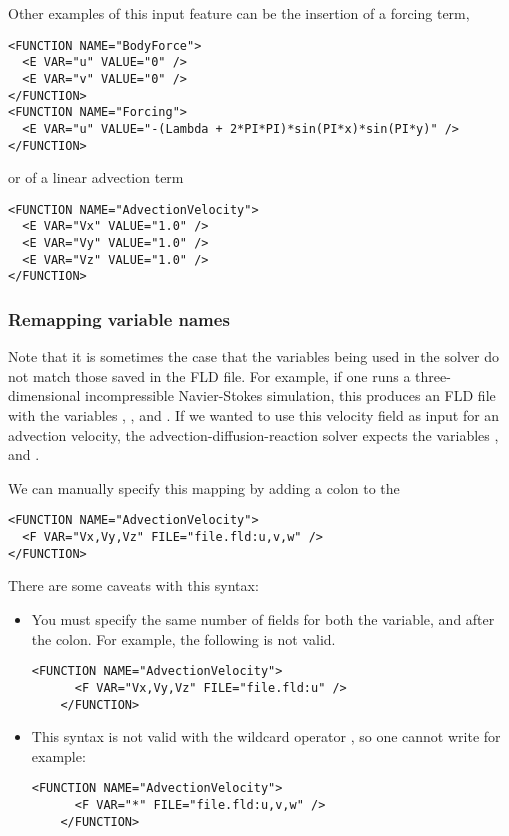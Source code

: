 Other examples of this input feature can be the insertion of a forcing term,

\begin{lstlisting}[style=XMLStyle]
<FUNCTION NAME="BodyForce">
  <E VAR="u" VALUE="0" />
  <E VAR="v" VALUE="0" />
</FUNCTION>
<FUNCTION NAME="Forcing">
  <E VAR="u" VALUE="-(Lambda + 2*PI*PI)*sin(PI*x)*sin(PI*y)" />
</FUNCTION>
\end{lstlisting}

or of a linear advection term

\begin{lstlisting}[style=XMLStyle]
<FUNCTION NAME="AdvectionVelocity">
  <E VAR="Vx" VALUE="1.0" />
  <E VAR="Vy" VALUE="1.0" />
  <E VAR="Vz" VALUE="1.0" />
</FUNCTION>
\end{lstlisting}

\subsubsection{Remapping variable names}

Note that it is sometimes the case that the variables being used in the solver
do not match those saved in the FLD file. For example, if one runs a
three-dimensional incompressible Navier-Stokes simulation, this produces an FLD
file with the variables , ,  and . If we
wanted to use this velocity field as input for an advection velocity, the
advection-diffusion-reaction solver expects the variables , 
and .

We can manually specify this mapping by adding a colon to the

\begin{lstlisting}[style=XMLStyle]
<FUNCTION NAME="AdvectionVelocity">
  <F VAR="Vx,Vy,Vz" FILE="file.fld:u,v,w" />
</FUNCTION>
\end{lstlisting}

There are some caveats with this syntax:

\begin{itemize}
  \item You must specify the same number of fields for both the variable, and
  after the colon. For example, the following is not valid.
  \begin{lstlisting}[style=XMLStyle,gobble=4]
    <FUNCTION NAME="AdvectionVelocity">
      <F VAR="Vx,Vy,Vz" FILE="file.fld:u" />
    </FUNCTION>\end{lstlisting}
  \item This syntax is not valid with the wildcard operator \inltt{*}, so one
  cannot write for example:
  \begin{lstlisting}[style=XMLStyle,gobble=4]
    <FUNCTION NAME="AdvectionVelocity">
      <F VAR="*" FILE="file.fld:u,v,w" />
    </FUNCTION>
  \end{lstlisting}
\end{itemize}


